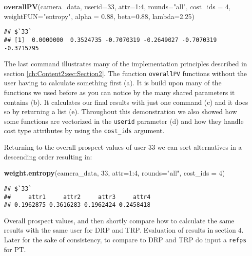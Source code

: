 \documentclass[]{article}
\newenvironment{Shaded}{\begin{snugshade}}{\end{snugshade}}
\newcommand{\KeywordTok}[1]{\textcolor[rgb]{0.13,0.29,0.53}{\textbf{{#1}}}}
\newcommand{\DataTypeTok}[1]{\textcolor[rgb]{0.13,0.29,0.53}{{#1}}}
\newcommand{\DecValTok}[1]{\textcolor[rgb]{0.00,0.00,0.81}{{#1}}}
\newcommand{\FloatTok}[1]{\textcolor[rgb]{0.00,0.00,0.81}{{#1}}}
\newcommand{\StringTok}[1]{\textcolor[rgb]{0.31,0.60,0.02}{{#1}}}
\newcommand{\NormalTok}[1]{{#1}}
\begin{document}
\begin{Shaded}
\begin{Highlighting}[]
\KeywordTok{overallPV}\NormalTok{(camera_data, }\DataTypeTok{userid=}\DecValTok{33}\NormalTok{, }\DataTypeTok{attr=}\DecValTok{1}\NormalTok{:}\DecValTok{4}\NormalTok{, }\DataTypeTok{rounds=}\StringTok{"all"}\NormalTok{, }\DataTypeTok{cost_ids =} \DecValTok{4}\NormalTok{,}
          \DataTypeTok{weightFUN=}\StringTok{"entropy"}\NormalTok{, }\DataTypeTok{alpha =} \FloatTok{0.88}\NormalTok{, }\DataTypeTok{beta=}\FloatTok{0.88}\NormalTok{, }\DataTypeTok{lambda=}\FloatTok{2.25}\NormalTok{)}
\end{Highlighting}
\end{Shaded}

\begin{verbatim}
## $`33`
## [1]  0.0000000  0.3524735 -0.7070319 -0.2649027 -0.7070319 -0.3715795
\end{verbatim}

The last command illustrates many of the implementation principles
described in section \ref{ch:Content2:sec:Section2}. The function
\texttt{overallPV} functions without the user having to calculate
something first (a). It is build upon many of the functions we used
before as you can notice by the many shared parameters it contains (b).
It calculates our final results with just one command (c) and it does so
by returning a list (e). Throughout this demonstration we also showed
how some functions are vectorized in the \texttt{userid} parameter (d)
and how they handle cost type attributes by using the \texttt{cost\_ids}
argument.

Returning to the overall prospect values of user 33 we can sort
alternatives in a descending order resulting in:

\begin{Shaded}
\begin{Highlighting}[]
\KeywordTok{weight.entropy}\NormalTok{(camera_data, }\DecValTok{33}\NormalTok{, }\DataTypeTok{attr=}\DecValTok{1}\NormalTok{:}\DecValTok{4}\NormalTok{, }\DataTypeTok{rounds=}\StringTok{"all"}\NormalTok{, }\DataTypeTok{cost_ids =} \DecValTok{4}\NormalTok{)}
\end{Highlighting}
\end{Shaded}

\begin{verbatim}
## $`33`
##     attr1     attr2     attr3     attr4 
## 0.1962875 0.3616283 0.1962424 0.2458418
\end{verbatim}

Overall prospect values, and then shortly compare how to calculate the
same results with the same user for DRP and TRP. Evaluation of results
in section 4. Later for the sake of consistency, to compare to DRP and
TRP do input a \texttt{refps} for PT.
\end{document}
